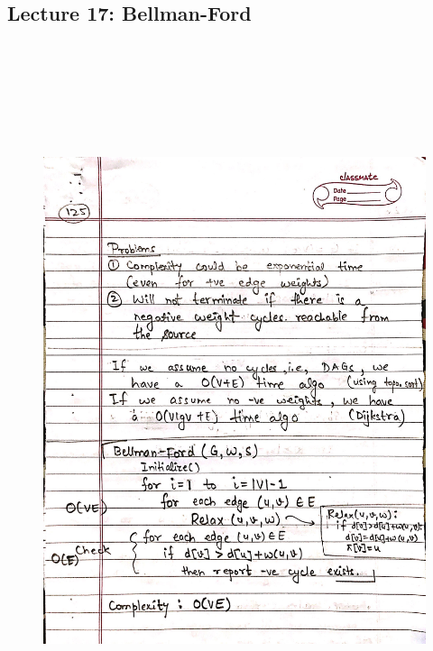 \newpage
{\color{black} \subsection*{Lecture 17: Bellman-Ford}}
\begin{figure}[H]
    \centering
    \includegraphics[width=16cm, height=21cm]{"./MIT-6.006/MIT-6006-125"}
\end{figure}

